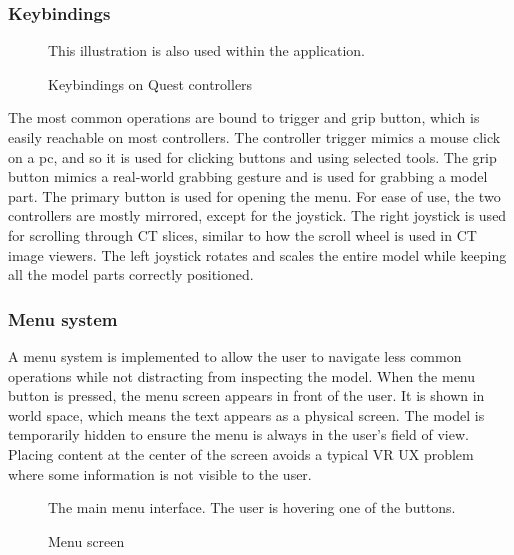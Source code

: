\documentclass[a4paper]{report}
\begin{document}
\subsubsection{Keybindings}

\begin{figure}[h!]
    \centering
	\hfill
  \caption{Keybindings on Quest controllers}
  \small
  This illustration is also used within the application.
\end{figure}

The most common operations are bound to trigger and grip button, which is easily reachable on most controllers. The controller trigger mimics a mouse click on a pc, and so it is used for clicking buttons and using selected tools. The grip button mimics a real-world grabbing gesture and is used for grabbing a model part.
The primary button is used for opening the menu.
For ease of use, the two controllers are mostly mirrored, except for the joystick. The right joystick is used for scrolling through CT slices, similar to how the scroll wheel is used in CT image viewers. The left joystick rotates and scales the entire model while keeping all the model parts correctly positioned.

\subsubsection{Menu system}
A menu system is implemented to allow the user to navigate less common operations while not distracting from inspecting the model.
When the menu button is pressed, the menu screen appears in front of the user. It is shown in world space, which means the text appears as a physical screen. The model is temporarily hidden to ensure the menu is always in the user's field of view. Placing content at the center of the screen avoids a typical VR UX problem where some information is not visible to the user.

\begin{figure}[h!]
    \centering
	\hfill
  \caption{Menu screen}
  \small
  The main menu interface. The user is hovering one of the buttons.
\end{figure}
\end{document}
